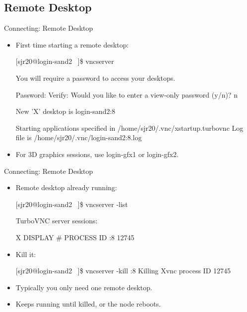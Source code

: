 \subsection{Remote Desktop}
\begin{frame}[fragile]{Connecting: Remote Desktop}
\begin{itemize}
\item First time starting a remote desktop:
\begin{semiverbatim}
\footnotesize
[sjr20@{\color{red}login-sand2} ~]\$ vncserver

You will require a password to access your desktops.

Password: 
Verify:   
Would you like to enter a view-only password (y/n)? n

New 'X' desktop is {\color{red}login-sand2:8}

Starting applications specified in /home/sjr20/.vnc/xstartup.turbovnc
Log file is /home/sjr20/.vnc/login-sand2:8.log
\end{semiverbatim}
\smallskip\item<2->\alert{For 3D graphics sessions, use {\color{red}login-gfx1} or {\color{red}login-gfx2}.}
\end{itemize}
\end{frame}

\begin{frame}[fragile]{Connecting: Remote Desktop}
\begin{itemize}
\item Remote desktop already running:
\begin{semiverbatim}
\footnotesize
[sjr20@login-sand2 ~]\$ vncserver -list

TurboVNC server sessions:

X DISPLAY #     PROCESS ID
:8              12745
\end{semiverbatim}
\smallskip\item Kill it:
\begin{semiverbatim}
\footnotesize
[sjr20@login-sand2 ~]\$ vncserver -kill :8
Killing Xvnc process ID 12745
\end{semiverbatim}
\smallskip\item\alert{Typically you only need {\color{red}one} remote desktop.}
\item\alert{Keeps running until killed, or the node reboots.}
\end{itemize}
\end{frame}

